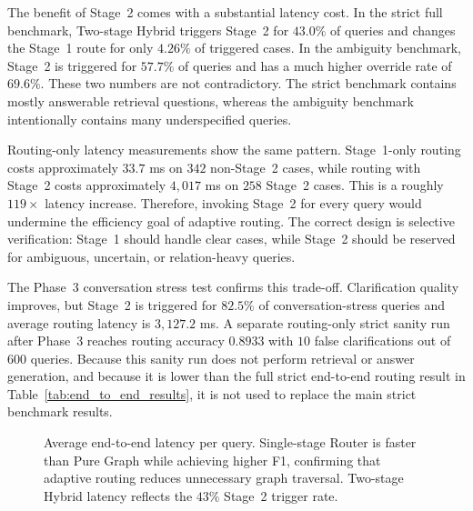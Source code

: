 \documentclass[11pt,twocolumn]{article}
\begin{document}
The benefit of Stage~2 comes with a substantial latency cost.
In the strict full benchmark, Two-stage Hybrid triggers
Stage~2 for $43.0\%$ of queries and changes the Stage~1 route
for only $4.26\%$ of triggered cases. In the ambiguity
benchmark, Stage~2 is triggered for $57.7\%$ of queries and
has a much higher override rate of $69.6\%$. These two
numbers are not contradictory. The strict benchmark contains
mostly answerable retrieval questions, whereas the ambiguity
benchmark intentionally contains many underspecified queries.

Routing-only latency measurements show the same pattern.
Stage~1-only routing costs approximately $33.7$ ms on
$342$ non-Stage~2 cases, while routing with Stage~2 costs
approximately $4{,}017$ ms on $258$ Stage~2 cases. This is a
roughly $119\times$ latency increase. Therefore, invoking
Stage~2 for every query would undermine the efficiency goal
of adaptive routing. The correct design is selective
verification: Stage~1 should handle clear cases, while
Stage~2 should be reserved for ambiguous, uncertain, or
relation-heavy queries.

The Phase~3 conversation stress test confirms this trade-off.
Clarification quality improves, but Stage~2 is triggered for
$82.5\%$ of conversation-stress queries and average routing
latency is $3{,}127.2$ ms. A separate routing-only strict
sanity run after Phase~3 reaches routing accuracy $0.8933$
with $10$ false clarifications out of $600$ queries. Because
this sanity run does not perform retrieval or answer
generation, and because it is lower than the full strict
end-to-end routing result in Table~\ref{tab:end_to_end_results},
it is not used to replace the main strict benchmark results.

\begin{figure}[!htbp]
\centering
{}
\caption{Average end-to-end latency per query. Single-stage Router
is faster than Pure Graph while achieving higher F1, confirming
that adaptive routing reduces unnecessary graph traversal. Two-stage
Hybrid latency reflects the $43\%$ Stage~2 trigger rate.}
\label{fig:latency_comparison}
\end{figure}
\end{document}
